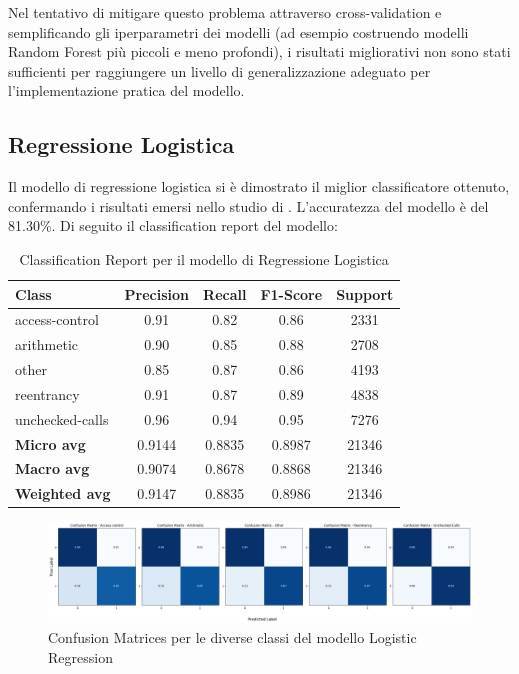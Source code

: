 \documentclass[../../Thesis.tex]{subfiles}
\begin{document}
Nel tentativo di mitigare questo problema attraverso cross-validation e semplificando gli iperparametri dei modelli (ad esempio costruendo modelli Random Forest pi\`u piccoli e meno profondi), i risultati migliorativi non sono stati sufficienti per raggiungere un livello di generalizzazione adeguato per l'implementazione pratica del modello.

\subsection{Regressione Logistica}
Il modello di regressione logistica si \`e dimostrato il miglior classificatore ottenuto, confermando i risultati emersi nello studio di \cite{Deng}. L'accuratezza del modello \`e del 81.30\%. Di seguito il classification report del modello:

\begin{table}[H]
    \centering
    \small
    \begin{tabular}{lcccc}
    \hline
    \textbf{Class} & \textbf{Precision} & \textbf{Recall} & \textbf{F1-Score} & \textbf{Support} \\
    \hline
    access-control & 0.91 & 0.82 & 0.86 & 2331 \\
    arithmetic & 0.90 & 0.85 & 0.88 & 2708 \\
    other & 0.85 & 0.87 & 0.86 & 4193 \\
    reentrancy & 0.91 & 0.87 & 0.89 & 4838 \\
    unchecked-calls & 0.96 & 0.94 & 0.95 & 7276 \\
    \hline
    \textbf{Micro avg} & 0.9144 & 0.8835 & 0.8987 & 21346 \\
    \textbf{Macro avg} & 0.9074 & 0.8678 & 0.8868 & 21346 \\
    \textbf{Weighted avg} & 0.9147 & 0.8835 & 0.8986 & 21346 \\
    \hline
    \end{tabular}
    \caption{Classification Report per il modello di Regressione Logistica}
\end{table}

\begin{figure}[H]
    \includegraphics[width=1.05\textwidth]{../../img/CF-LR.png}
    \caption{Confusion Matrices per le diverse classi del modello Logistic Regression}
\end{figure}
\end{document}
